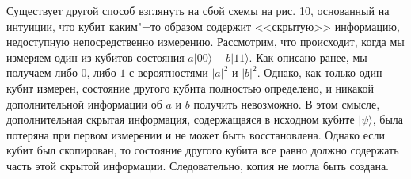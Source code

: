 \begin{multicols}{2}
{        Существует другой способ взглянуть на сбой схемы на рис. 10, основанный на
        интуиции, что кубит каким"=то образом содержит <<скрытую>> информацию, недоступную
        непосредственно измерению. Рассмотрим, что происходит, когда мы измеряем один из кубитов состояния $a\vert00\rangle+b\vert11\rangle$. 
        Как описано ранее, мы получаем либо $0$, либо $1$ с вероятностями $\vert a\vert^2$ и $\vert b\vert^2$. Однако, как только один кубит измерен, состояние другого кубита полностью
        определено, и никакой дополнительной информации об $a$ и $b$ получить невозможно. В этом смысле,
        дополнительная скрытая информация, содержащаяся в исходном кубите $\vert\psi\rangle$, была потеряна при первом измерении и не может быть восстановлена. Однако если кубит был скопирован, то состояние
        другого кубита все равно должно содержать часть этой скрытой информации. Следовательно, копия не могла быть создана.
    }\\

\end{multicols}
